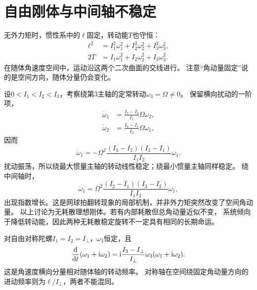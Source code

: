 \section{自由刚体与中间轴不稳定}
无外力矩时，惯性系中的$\bm\ell$固定，转动能$T$也守恒：
\begin{subequations}
 \begin{align}
  \ell^2 &= I_1^2\omega_1^2 + I_2^2\omega_2^2 + I_3^2\omega_3^2,\\
  2T &= I_1\omega_1^2 + I_2\omega_2^2 + I_3\omega_3^2.
 \end{align}
\end{subequations}
在随体角速度空间中，运动沿这两个二次曲面的交线进行。
注意“角动量固定”说的是空间方向，随体分量仍会变化。

设$0 < I_1 < I_2 < I_3$，考察绕第3主轴的定常转动$\omega_3 = \Omega \ne 0$。
保留横向扰动的一阶项，
\begin{subequations}
 \begin{align}
  \dot\omega_1 &= \frac{I_2 - I_3}{I_1}\Omega\omega_2,\\
  \dot\omega_2 &= \frac{I_3 - I_1}{I_2}\Omega\omega_1,
 \end{align}
\end{subequations}
因而
\begin{equation}
 \ddot\omega_1 = -\Omega^2
 \frac{(I_3 - I_2)(I_3 - I_1)}{I_1I_2}\omega_1.
\end{equation}
扰动振荡，所以绕最大惯量主轴的转动线性稳定；绕最小惯量主轴同样稳定。
绕中间轴时，
\begin{equation}
 \ddot\omega_1 = \Omega^2
 \frac{(I_2 - I_1)(I_3 - I_2)}{I_1I_3}\omega_1,
\end{equation}
出现指数增长。这是网球拍翻转现象的局部机制，并非外力矩突然改变了空间角动量。
以上讨论为无耗散理想刚体。若有内部耗散但总角动量近似不变，
系统倾向于降低转动能，因此两种无耗散稳定旋转不一定具有相同的长期命运。

对自由对称陀螺$I_1 = I_2 = I_\perp$，$\omega_3$恒定，且
\begin{equation}
 \frac{\mathop{}\!\mathrm{d}^{}}{\mathrm{d}{t}^{}}(\omega_1 + \mathrm{i}\omega_2)
 = \mathrm{i}\frac{I_3 - I_\perp}{I_\perp}\omega_3(\omega_1 + \mathrm{i}\omega_2).
\end{equation}
这是角速度横向分量相对随体轴的转动频率。
对称轴在空间绕固定角动量方向的进动频率则为$\ell/I_\perp$，两者不能混同。

